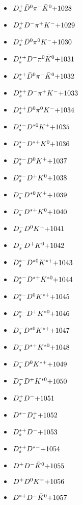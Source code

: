 \begin{multicols}{3}
\begin{itemize}
 \item $ D_{s}^{+} \bar{D}^{0} \pi^{-} \bar{K}^{0} \hfill{+1028}$
 \item $ D_{s}^{+} D^{-} \pi^{+} K^{-} \hfill{+1029}$
 \item $ D_{s}^{+} \bar{D}^{0} \pi^{0} K^{-} \hfill{+1030}$
 \item $ D_{s}^{*+} D^{-} \pi^{0} \bar{K}^{0} \hfill{+1031}$
 \item $ D_{s}^{*+} \bar{D}^{0} \pi^{-} \bar{K}^{0} \hfill{+1032}$
 \item $ D_{s}^{*+} D^{-} \pi^{+} K^{-} \hfill{+1033}$
 \item $ D_{s}^{*+} \bar{D}^{0} \pi^{0} K^{-} \hfill{+1034}$
 \item $ D_{s}^{*-} D^{*0} K^{+} \hfill{+1035}$
 \item $ D_{s}^{*-} D^{*+} K^{0} \hfill{+1036}$
 \item $ D_{s}^{*-} D^{0} K^{+} \hfill{+1037}$
 \item $ D_{s}^{*-} D^{+} K^{0} \hfill{+1038}$
 \item $ D_{s}^{-} D^{*0} K^{+} \hfill{+1039}$
 \item $ D_{s}^{-} D^{*+} K^{0} \hfill{+1040}$
 \item $ D_{s}^{-} D^{0} K^{+} \hfill{+1041}$
 \item $ D_{s}^{-} D^{+} K^{0} \hfill{+1042}$
 \item $ D_{s}^{*-} D^{*0} K^{*+} \hfill{+1043}$
 \item $ D_{s}^{*-} D^{*+} K^{*0} \hfill{+1044}$
 \item $ D_{s}^{*-} D^{0} K^{*+} \hfill{+1045}$
 \item $ D_{s}^{*-} D^{+} K^{*0} \hfill{+1046}$
 \item $ D_{s}^{-} D^{*0} K^{*+} \hfill{+1047}$
 \item $ D_{s}^{-} D^{*+} K^{*0} \hfill{+1048}$
 \item $ D_{s}^{-} D^{0} K^{*+} \hfill{+1049}$
 \item $ D_{s}^{-} D^{+} K^{*0} \hfill{+1050}$
 \item $ D_{s}^{+} D^{-} \hfill{+1051}$
 \item $ D^{*-} D_{s}^{+} \hfill{+1052}$
 \item $ D_{s}^{*+} D^{-} \hfill{+1053}$
 \item $ D_{s}^{*+} D^{*-} \hfill{+1054}$
 \item $ D^{+} D^{-} \bar{K}^{0} \hfill{+1055}$
 \item $ D^{+} D^{0} K^{-} \hfill{+1056}$
 \item $ D^{*+} D^{-} \bar{K}^{0} \hfill{+1057}$

\end{itemize}
\end{multicols}
